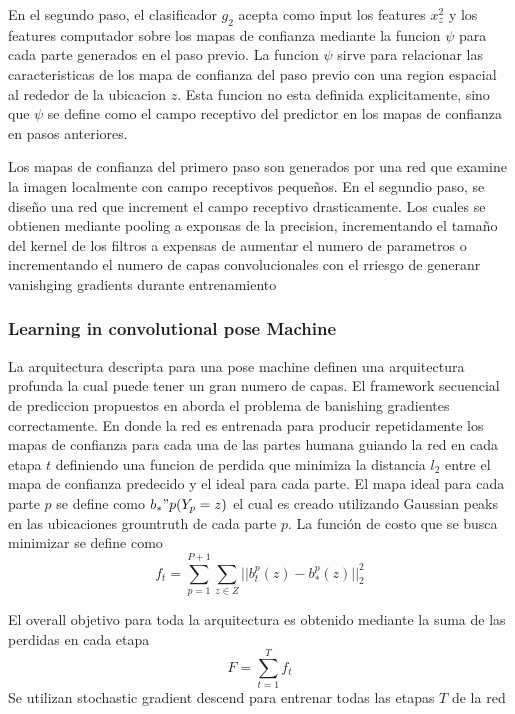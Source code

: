\documentclass[runningheads]{llncs}
\begin{document}
En el segundo paso, el clasificador $g_2$ acepta como input los features $x_z^2$ y los features computador sobre los mapas de confianza mediante la funcion $\psi$ para cada parte generados en el paso previo. La funcion $\psi$ sirve para relacionar las caracteristicas de los mapa de confianza del paso previo con una region espacial al rededor de la ubicacion $z$. Esta funcion no esta definida explicitamente, sino que $\psi$ se define como el campo receptivo del predictor en los mapas de confianza en pasos anteriores.

Los mapas de confianza del primero paso son generados por una red que examine la imagen localmente con campo receptivos pequeños. En el segundio paso, se diseño una red que increment el campo receptivo drasticamente. Los cuales se obtienen mediante pooling a exponsas de la precision, incrementando el tamaño del kernel de los filtros a expensas de aumentar el numero de parametros o incrementando el numero de capas convolucionales con el rriesgo de generanr vanishging gradients durante entrenamiento

\subsubsection{Learning in convolutional pose Machine}
La arquitectura descripta para una pose machine definen una arquitectura profunda la cual puede tener un gran numero de capas. El framework secuencial de prediccion propuestos en \cite{convposemachine} aborda el problema de banishing gradientes correctamente. En donde la red es entrenada para producir repetidamente los mapas de confianza para cada una de las partes humana guiando la red en cada etapa $t$ definiendo una funcion de perdida que minimiza la distancia $l_2$ entre el mapa de confianza predecido y el ideal para cada parte. El mapa ideal para cada parte $p$ se define como $b_*"p(Y_p=z)$ el cual es creado utilizando Gaussian peaks en las ubicaciones grountruth de cada parte $p$.
La función de costo que se busca minimizar se define como
\begin{equation}
f_t = \sum_{p=1}^{P+1}\sum_{z\in Z}||b_t^p(z) - b_*^p(z)||_2^2
\end{equation}

El overall objetivo para toda la arquitectura es obtenido mediante la suma de las perdidas en cada etapa
\begin{equation}
\textit{F} = \sum_{t=1}^{\textit{T}}f_t
\end{equation}
Se utilizan stochastic gradient descend para entrenar todas las etapas $\textit{T}$ de la red
\end{document}
